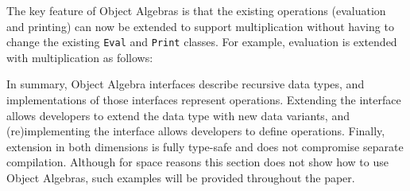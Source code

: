 
\noindent The key feature of Object Algebras is that the existing operations
(evaluation and printing) can now be extended to support
multiplication without having to change the existing \lstinline{Eval}
and \lstinline{Print} classes. For example, evaluation is extended
with multiplication as follows:


In summary, Object Algebra interfaces describe recursive data types,
and implementations of those interfaces represent
operations. Extending the interface allows developers to extend the
data type with new data variants, and (re)implementing the interface
allows developers to define operations.  Finally, extension in both
dimensions is fully type-safe and does not compromise separate
compilation. Although for space reasons this section does not show
how to use Object Algebras, such examples will be provided throughout
the paper.





\begin{comment}

This paper showed how various types of traversals for complex
structures can be automatically provided by \Name. \name traversals are
written directly in Java and are type-safe, extensible and separately
compilable. There has always been a tension between the
correctness guarantees of static typing, and the flexibility of
untyped/dynamically-typed approaches. \name shows that even
in type systems like Java's, it is possible to get considerable
flexibility and adaptability for the problem of boilerplate code in
traversals of complex structures, without giving up modular static typing.

There are many of avenues for future work. One area of research is to
extend \name traversals to support flexible traversal strategies,
similarly to strategic
programming~\cite{borovansky1996elan,visser1998core,vandenBrand:2003:TRT:941566.941568}. Another
line of work worth exploring is to adopt generalizations of object
algebras~\cite{oliveira13fop} for added expressiveness of \name
traversals.

\end{comment}
